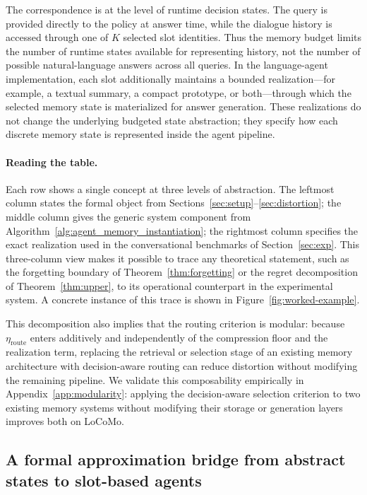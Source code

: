 \documentclass{article}
\theoremstyle{plain}
\theoremstyle{definition}
\theoremstyle{remark}
\begin{document}
The correspondence is at the level of runtime decision states.
The query is provided directly to the policy at answer time, while the dialogue history is accessed through one of $K$ selected slot identities.
Thus the memory budget limits the number of runtime states available for representing history, not the number of possible natural-language answers across all queries.
In the language-agent implementation, each slot additionally maintains a bounded realization---for example, a textual summary, a compact prototype, or both---through which the selected memory state is materialized for answer generation.
These realizations do not change the underlying budgeted state abstraction; they specify how each discrete memory state is represented inside the agent pipeline.

\paragraph{Reading the table.}
Each row shows a single concept at three levels of abstraction.
The leftmost column states the formal object from Sections~\ref{sec:setup}--\ref{sec:distortion}; the middle column gives the generic system component from Algorithm~\ref{alg:agent_memory_instantiation}; the rightmost column specifies the exact realization used in the conversational benchmarks of Section~\ref{sec:exp}.
This three-column view makes it possible to trace any theoretical statement, such as the forgetting boundary of Theorem~\ref{thm:forgetting} or the regret decomposition of Theorem~\ref{thm:upper}, to its operational counterpart in the experimental system.
A concrete instance of this trace is shown in Figure~\ref{fig:worked-example}.

This decomposition also implies that the routing criterion is modular: because $\eta_{\mathrm{route}}$ enters additively and independently of the compression floor and the realization term, replacing the retrieval or selection stage of an existing memory architecture with decision-aware routing can reduce distortion without modifying the remaining pipeline.
We validate this composability empirically in Appendix~\ref{app:modularity}: applying the decision-aware selection criterion to two existing memory systems without modifying their storage or generation layers improves both on LoCoMo.


\subsection{A formal approximation bridge from abstract states to slot-based agents}
\label{app:bridge}
\end{document}
